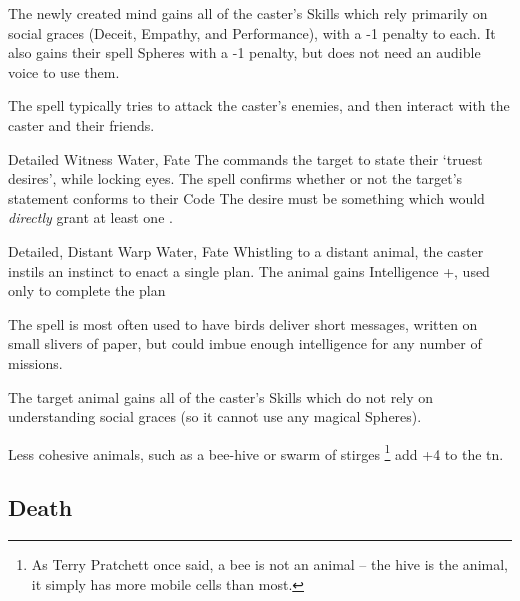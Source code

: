 \begin{multicols}{2}
{  The newly created mind gains all of the caster's Skills which rely primarily on social graces (Deceit, Empathy, and Performance), with a -1 penalty to each.
  It also gains their spell Spheres with a -1 penalty, but does not need an audible voice to use them.

  The spell typically tries to attack the caster's enemies, and then interact with the caster and their friends.

  }

  {Detailed}%
  {Witness}%
  {Water, Fate}%
  {}%
  {The  commands the target to state their `truest desires', while locking eyes.
    The spell confirms whether or not the target's statement conforms to their Code}%
  {The desire must be something which would \textit{directly} grant at least one .%
  }

\label{carrierCrow}
  {Detailed, Distant}%
  {Warp}%
  {Water, Fate}%
  {}%
  {Whistling to a distant animal, the caster instils an instinct to enact a single plan.
  The animal gains Intelligence +, used only to complete the plan}%
  {
  The spell is most often used to have birds deliver short messages, written on small slivers of paper, but could imbue enough intelligence for any number of missions.

  The target animal gains all of the caster's Skills which do not rely on understanding social graces (so it cannot use any magical Spheres).

  Less cohesive animals, such as a bee-hive or swarm of stirges%
  \footnote{As Terry Pratchett once said, a bee is not an animal -- the hive is the animal, it simply has more mobile cells than most.}
  add +4 to the \gls{tn}.
  }




\subsection{Death}
\label{Death1}




\end{multicols}
